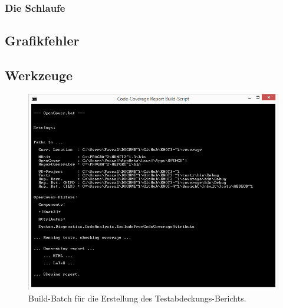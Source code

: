 		~\\
	
	
\clearpage	


	\subsubsection*{Die \glqq Schlaufe\grqq}
	






\newpage




\subsection*{Grafikfehler}



\newpage



\subsection*{Werkzeuge}



\begin{figure}[ht]

	\centering
	
	\includegraphics[width=\textwidth]{Inhalt/Anhang/Grafiken/Werkzeuge/Code-Coverage Report Build-Script.png}
	
	\caption{Build-Batch für die Erstellung des Testabdeckungs-Berichts.}

\end{figure}








